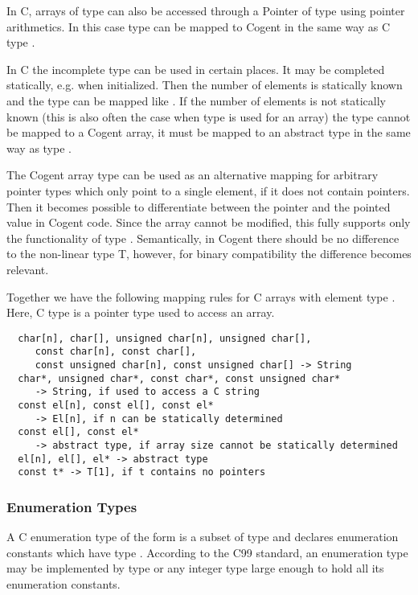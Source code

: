 In C, arrays of type  can also be accessed through a Pointer of type  using pointer
arithmetics. In this case type  can be mapped to Cogent in the same way as C type .

In C the incomplete type  can be used in certain places. It may be completed statically, e.g. 
when initialized. Then the number of elements is statically known and the type can be mapped like .
If the number of elements is not statically known (this is also often the case when type  
is used for an array) the type cannot be mapped to a Cogent array, it must be mapped to an abstract type in
the same way as type .

The Cogent array type  can be used as an alternative mapping for arbitrary pointer types which 
only point to a single element, if it does not contain pointers. Then it becomes possible to differentiate 
between the pointer and the pointed value in Cogent code. Since the array cannot be modified, this fully 
supports only the functionality of type . Semantically, in Cogent there should be no difference 
to the non-linear type T, however, for binary compatibility the difference becomes relevant.

Together we have the following mapping rules for C arrays with element type . Here, C type  
is a pointer type used to access an array.
\begin{verbatim}
  char[n], char[], unsigned char[n], unsigned char[], 
     const char[n], const char[],
     const unsigned char[n], const unsigned char[] -> String
  char*, unsigned char*, const char*, const unsigned char* 
     -> String, if used to access a C string
  const el[n], const el[], const el* 
     -> El[n], if n can be statically determined
  const el[], const el* 
     -> abstract type, if array size cannot be statically determined
  el[n], el[], el* -> abstract type
  const t* -> T[1], if t contains no pointers
\end{verbatim}

\subsubsection{Enumeration Types}
\label{design-types-enum}

A C enumeration type of the form  is a subset of type  and declares enumeration 
constants which have type . According to the C99 standard, an enumeration type may be implemented
by type  or any integer type large enough to hold all its enumeration constants.

